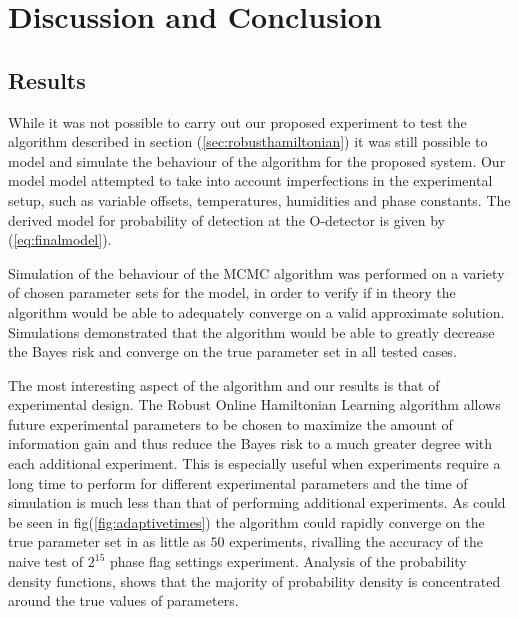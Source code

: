 
\chapter{Discussion and Conclusion} %
\label{Chapter5}

\section{Results}
While it was not possible to carry out our proposed experiment to test the algorithm described in section (\ref{sec:robusthamiltonian}) it was still possible to model and simulate the behaviour of the algorithm for the proposed system. Our model model attempted to take into account imperfections in the experimental setup, such as variable offsets, temperatures, humidities and phase constants. The derived model for probability of detection at the O-detector is given by (\ref{eq:finalmodel}).

Simulation of the behaviour of the MCMC algorithm was performed on a variety of chosen parameter sets for the model, in order to verify if in theory the algorithm would be able to adequately converge on a valid approximate solution. Simulations demonstrated that the algorithm would be able to greatly decrease the Bayes risk and converge on the true parameter set in all tested cases.   

The most interesting aspect of the algorithm and our results is that of experimental design. The Robust Online Hamiltonian Learning algorithm allows future experimental parameters to be chosen to maximize the amount of information gain and thus reduce the Bayes risk to a much greater degree with each additional experiment. This is especially useful when experiments require a long time to perform for different experimental parameters and the time of simulation is much less than that of performing additional experiments. As could be seen in fig(\ref{fig:adaptivetimes}) the algorithm could rapidly converge on the true parameter set in as little as $50$ experiments, rivalling the accuracy of the naive test of $2^15$ phase flag settings experiment. Analysis of the probability density functions, shows that the majority of probability density is concentrated around the true values of parameters. 

